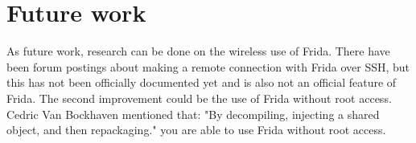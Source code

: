 \documentclass[12pt, a4paper]{report}
\begin{document}
\section{Future work}

As future work, research can be done on the wireless use of Frida. There have been forum postings about making a remote connection with Frida over SSH, but this has not been officially documented yet and is also not an official feature of Frida.
\newline
\newline
The second improvement could be the use of Frida without root access. Cedric Van Bockhaven mentioned that: "By decompiling, injecting a shared object, and then repackaging." you are able to use Frida without root access.





\end{document}
